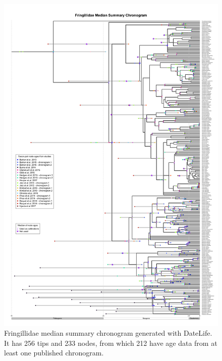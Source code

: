 \documentclass[
  english,
  man]{apa6}
\begin{document}
\begin{figure}[!h]
\includegraphics{../figures/figure-fringillidae/median_and_calibration_ages-congruified.png}
\caption{Fringillidae median summary chronogram generated with DateLife. It has 256 tips and 233 nodes, from which 212 have age data from at least one published chronogram.}
\label{fig:fringillidages}
\end{figure}


\end{document}

